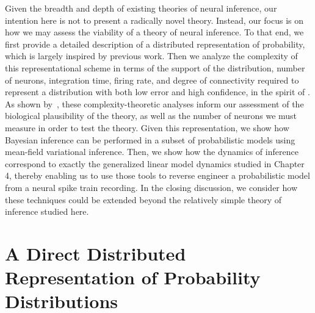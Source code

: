 Given the breadth and depth of existing theories of neural inference,
our intention here is not to present a radically novel
theory. Instead, our focus is on how we may assess the viability of a
theory of neural inference. To that end, we first provide a detailed
description of a distributed representation of probability, which is
largely inspired by previous work.  Then we analyze the complexity of
this representational scheme in terms of the support of the
distribution, number of neurons, integration time, firing rate, and
degree of connectivity required to represent a distribution with both
low error and high confidence, in the spirit of
\citet{valiant1994circuits, valiant2005memorization}.  As shown
by~\citet{gao2015simplicity}, these complexity-theoretic analyses
inform our assessment of the biological plausibility of the theory, as
well as the number of neurons we must measure in order to test the
theory. Given this representation, we show how Bayesian inference can
be performed in a subset of probabilistic models using mean-field
variational inference. Then, we show how the dynamics of inference
correspond to exactly the generalized linear model dynamics studied in
Chapter 4, thereby enabling us to use those tools to reverse engineer
a probabilistic model from a neural spike train recording.  In the
closing discussion, we consider how these techniques could be extended
beyond the relatively simple theory of inference studied here.

\section{A Direct Distributed Representation of Probability Distributions}
\label{sec:representation}

